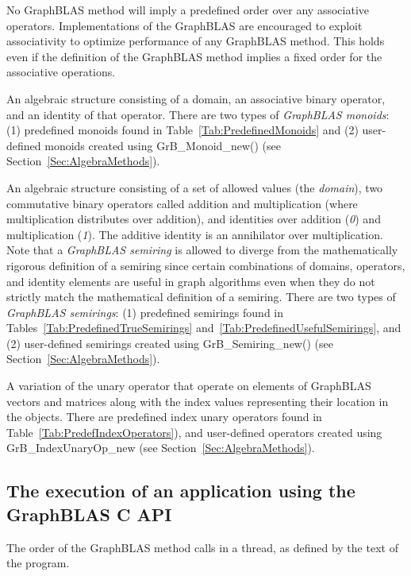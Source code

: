 No GraphBLAS method will imply a predefined order over any associative operators. Implementations of the GraphBLAS are encouraged to exploit associativity to optimize performance of any GraphBLAS method. This holds even if the definition of the GraphBLAS method implies a fixed order for the associative operations.

 An algebraic structure consisting of a domain, an associative 
binary operator, and an identity of that operator.  There are two types 
of \emph{GraphBLAS monoids}: (1) predefined monoids found in 
Table~\ref{Tab:PredefinedMonoids} and (2) user-defined monoids created using 
{\sf GrB\_Monoid\_new()} (see Section~\ref{Sec:AlgebraMethods}). 

 An algebraic structure consisting of a set of allowed values
(the \emph{domain}), two commutative binary operators called addition 
and multiplication (where multiplication distributes over addition),
and identities over addition (\emph{0}) and multiplication (\emph{1}).  The additive
identity is an annihilator over multiplication.   
Note that a \emph{GraphBLAS semiring} is allowed to diverge from the mathematically 
rigorous definition of a semiring since certain combinations of domains, operators, and identity 
elements are useful in graph algorithms even when they do not strictly match the mathematical
definition of a semiring.
There are two types 
of \emph{GraphBLAS semirings}: (1) predefined semirings found in 
Tables~\ref{Tab:PredefinedTrueSemirings} and~\ref{Tab:PredefinedUsefulSemirings}, and (2) user-defined semirings created using 
{\sf GrB\_Semiring\_new()} (see Section~\ref{Sec:AlgebraMethods}).

 A variation of the unary operator that operate
on elements of GraphBLAS vectors and matrices along with the index values 
representing their location in the objects.  There are predefined index unary
operators found in Table~\ref{Tab:PredefIndexOperators}), and user-defined
operators created using {\sf GrB\_IndexUnaryOp\_new} (see Section~\ref{Sec:AlgebraMethods}). 
\glossEnd

\subsection{The execution of an application using the GraphBLAS C API}

\glossBegin
{} The order of the GraphBLAS method calls in a
thread, as defined by the text of the program.

